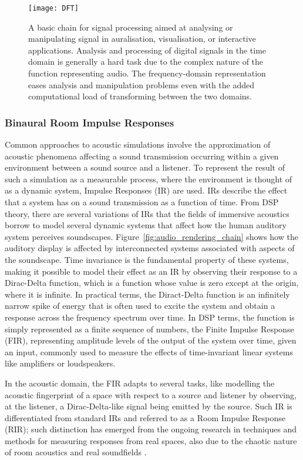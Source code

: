 \begin{figure}[htb]
    \centering
    \texttt{[image: DFT]}
    \caption{A basic chain for signal processing aimed at analysing or manipulating signal in auralisation, visualisation, or interactive applications. Analysis and processing of digital signals in the time domain is generally a hard task due to the complex nature of the function representing audio. The frequency-domain representation eases analysis and manipulation problems even with the added computational load of transforming between the two domains.}
    \label{fig:DFT}
\end{figure}

\subsubsection{Binaural Room Impulse Responses}
\label{sec:ir-definition}
Common approaches to acoustic simulations involve the approximation of acoustic phenomena affecting a sound transmission occurring within a given environment between a sound source and a listener. To represent the result of such a simulation as a measurable process, where the environment is thought of as a dynamic system, Impulse Responses (IR) are used. IRs describe the effect that a system has on a sound transmission as a function of time. From DSP theory, there are several variations of IRs that the fields of immersive acoustics borrow to model several dynamic systems that affect how the human auditory system perceives soundscapes. Figure~\ref{fig:audio_rendering_chain} shows how the auditory display is affected by interconnected systems associated with aspects of the soundscape. Time invariance is the fundamental property of these systems, making it possible to model their effect as an IR by observing their response to a Dirac-Delta function, which is a function whose value is zero except at the origin, where it is infinite. In practical terms, the Diract-Delta function is an infinitely narrow spike of energy that is often used to excite the system and obtain a response across the frequency spectrum over time. In DSP terms, the function is simply represented as a finite sequence of numbers, the Finite Impulse Response (FIR), representing amplitude levels of the output of the system over time, given an input, commonly used to measure the effects of time-invariant linear systems like amplifiers or loudspeakers.\par
In the acoustic domain, the FIR adapts to several tasks, like modelling the acoustic fingerprint of a space with respect to a source and listener by observing, at the listener, a Dirac-Delta-like signal being emitted by the source. Such IR is differentiated from standard IRs and referred to as a Room Impulse Response (RIR); such distinction has emerged from the ongoing research in techniques and methods for measuring responses from real spaces, also due to the chaotic nature of room acoustics and real soundfields \cite{farina07}. 
